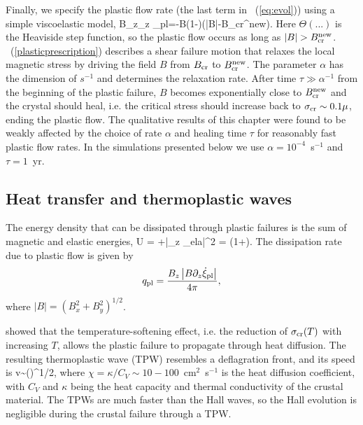 Finally, we specify the plastic flow rate (the last term in 
\Eq~(\ref{eq:evol})) using
a simple viscoelastic model,
\beq
B_z\partial_z \dot{\xi}_{\rm pl}=-\alpha B\left(1-\right)\Theta\left(|B|-B_{\rm cr}^{\rm new}\right).
\label{plasticprescription}
\eeq
Here $\Theta(...)$ is the Heaviside step function, so the plastic flow occurs as long as
$|B|>B_{\rm cr}^{\rm new}$. \Eq~(\ref{plasticprescription}) describes a shear failure motion 
that relaxes the local magnetic stress by driving the field $B$ from $B_{\rm cr}$ to $B_{\rm cr}^{\rm new}$.
The parameter $\alpha$ has the dimension of $s^{-1}$ and determines the relaxation rate.
After time $\tau\gg \alpha^{-1}$ from the beginning of the plastic failure, $B$ 
becomes exponentially close to $B_{\rm cr}^{\rm new}$ and the crystal should heal, i.e. the critical 
stress 
should increase
back to $\sigma_{\rm cr}\sim 0.1\mu$, ending the plastic flow. 
The qualitative results of this chapter were found to be weakly affected by the choice of rate 
$\alpha$ and healing time $\tau$ for reasonably fast plastic flow rates.
In the simulations presented below we use $\alpha=10^{-4}$~s$^{-1}$
and $\tau = 1$~yr.
 

\subsection{Heat transfer and thermoplastic waves}

The energy density that can be dissipated through plastic failures is 
the sum of magnetic and elastic energies,
\beq
 U = +\mu |\partial_z \xi_{\rm ela}|^2 
 = \left(1+\right).
\eeq 
The dissipation rate due to plastic flow is given by
\begin{equation}
   q_{\rm pl}={B_z\left|B\partial_z \dot{\xi}_{\rm pl}\right|\over 4\pi},
\label{qpl}
\end{equation}
where $|B|=(B_x^2+B_y^2)^{1/2}$.

\citet{2014ApJ...794L..24B} showed that the temperature-softening effect,
i.e. the reduction of $\sigma_{\rm cr}(T)$ with increasing $T$, allows the plastic failure to propagate through heat diffusion.
The resulting thermoplastic wave (TPW) resembles a deflagration front, and its speed is 
\beq
\label{eq:vTPW}
  v\sim(\alpha\chi)^{1/2},  
\eeq
where $\chi=\kappa/C_V\sim 10-100$~cm$^2$~s$^{-1}$
is the heat diffusion coefficient, 
with $C_V$ and $\kappa$ being the heat capacity and thermal conductivity of
the crustal
material.
The TPWs are much faster than the Hall waves, 
so the Hall evolution is negligible during the crustal failure through a TPW.

